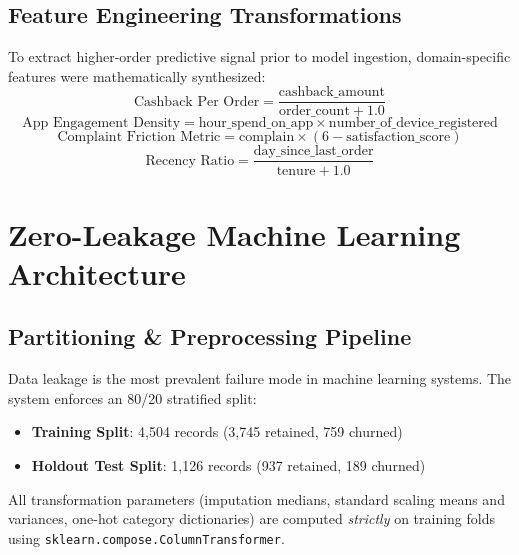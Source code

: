 \documentclass[11pt,a4paper]{article}
\begin{document}
\subsection{Feature Engineering Transformations}
To extract higher-order predictive signal prior to model ingestion, domain-specific features were mathematically synthesized:
\begin{equation}
    \text{Cashback Per Order} = \frac{\text{cashback\_amount}}{\text{order\_count} + 1.0}
\end{equation}
\begin{equation}
    \text{App Engagement Density} = \text{hour\_spend\_on\_app} \times \text{number\_of\_device\_registered}
\end{equation}
\begin{equation}
    \text{Complaint Friction Metric} = \text{complain} \times (6 - \text{satisfaction\_score})
\end{equation}
\begin{equation}
    \text{Recency Ratio} = \frac{\text{day\_since\_last\_order}}{\text{tenure} + 1.0}
\end{equation}

\section{Zero-Leakage Machine Learning Architecture}

\subsection{Partitioning \& Preprocessing Pipeline}
Data leakage is the most prevalent failure mode in machine learning systems. The system enforces an 80/20 stratified split:
\begin{itemize}[noitemsep]
    \item \textbf{Training Split}: 4,504 records (3,745 retained, 759 churned)
    \item \textbf{Holdout Test Split}: 1,126 records (937 retained, 189 churned)
\end{itemize}

All transformation parameters (imputation medians, standard scaling means and variances, one-hot category dictionaries) are computed \textit{strictly} on training folds using \texttt{sklearn.compose.ColumnTransformer}.
\end{document}
